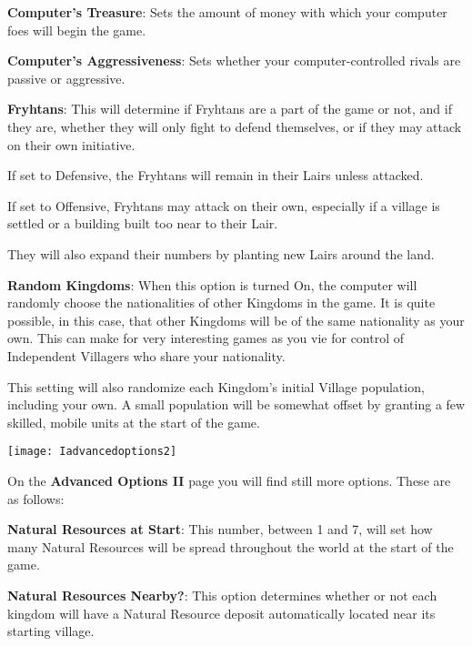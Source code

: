 \textbf{Computer’s Treasure}: Sets the amount of money with which your computer foes will begin the game.


\textbf{Computer’s Aggressiveness}: Sets whether your computer-controlled rivals are passive or aggressive.

\textbf{Fryhtans}: This will determine if Fryhtans are a part of the game or not, and if they are, whether they will only fight to defend themselves, or if they may attack on their own initiative.


\begin{changemargin}{.5cm}{0cm}
If set to Defensive, the Fryhtans will remain in their Lairs unless attacked.

If set to Offensive, Fryhtans may attack on their own, especially if a village is settled or a building built too near to their Lair. 

They will also expand their numbers by planting new Lairs around the land.
\end{changemargin}

\textbf{Random Kingdoms}: When this option is turned On, the computer will randomly choose the nationalities of other Kingdoms in the game. It is quite possible, in this case, that other Kingdoms will be of the same nationality as your own. This can make for very interesting games as you vie for control of Independent Villagers who share your nationality.

This setting will also randomize each Kingdom’s initial Village population, including your own. A small population will be somewhat offset by granting a few skilled, mobile units at the start of the game.

\begin{center}
    \texttt{[image: Iadvancedoptions2]} %
\end{center}

On the \textbf{Advanced Options II} page you will find still more options. These are as follows:

\textbf{Natural Resources at Start}: This number, between 1 and 7, will set how many Natural Resources will be spread throughout the world at the start of the game.

\textbf{Natural Resources Nearby?}: This option determines whether or not each kingdom will have a Natural Resource deposit automatically located near its starting village.

